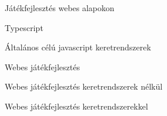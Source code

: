 \begin{MyChapter}{Játékfejlesztés webes alapokon}
	\begin{MySection}{Typescript}
	\end{MySection}

	\begin{MySection}{Általános célú javascript keretrendszerek}
	\end{MySection}

	\begin{MySection}{Webes játékfejlesztés}
	\end{MySection}

	\begin{MySection}{Webes játékfejlesztés keretrendszerek nélkül}
	\end{MySection}

	\begin{MySection}{Webes játékfejlesztés keretrendszerekkel}
	\end{MySection}
	
\end{MyChapter}